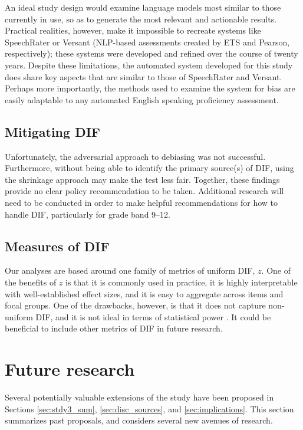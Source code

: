 \documentclass [PhD] {uclathes}
\begin{document}
An ideal study design would examine language models most similar to those currently in use, so as to generate the most relevant and actionable results. Practical realities, however, make it impossible to recreate systems like SpeechRater or Versant (NLP-based assessments created by ETS and Pearson, respectively); these systems were developed and refined over the course of twenty years. Despite these limitations, the automated system developed for this study does share key aspects that are similar to those of SpeechRater and Versant. Perhaps more importantly, the methods used to examine the system for bias are easily adaptable to any automated English speaking proficiency assessment.

\subsection{Mitigating DIF}

Unfortunately, the adversarial approach to debiasing was not successful. Furthermore, without being able to identify the primary source(s) of DIF, using the shrinkage approach may make the test less fair. Together, these findings provide no clear policy recommendation to be taken. Additional research will need to be conducted in order to make helpful recommendations for how to handle DIF, particularly for grade band 9–12. 

\subsection{Measures of DIF}

Our analyses are based around one family of metrics of uniform DIF, $z$. One of the benefits of $z$ is that it is commonly used in practice, it is highly interpretable with well-established effect sizes, and it is easy to aggregate across items and focal groups. One of the drawbacks, however, is that it does not capture non-uniform DIF, and it is not ideal in terms of statistical power \citep{woods2013}. It could be beneficial to include other metrics of DIF in future research.

\section{Future research}

Several potentially valuable extensions of the study have been proposed in Sections \ref{sec:stdy3_sum}, \ref{sec:disc_sources}, and \ref{sec:implications}. This section summarizes past proposals, and considers several new avenues of research.
\end{document}
